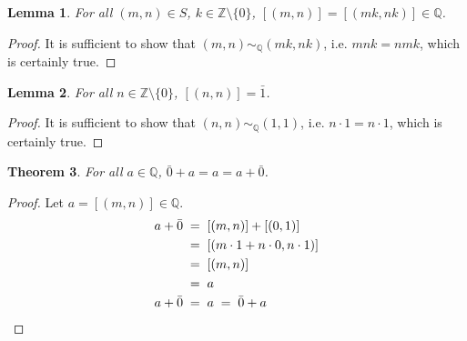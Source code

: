 \documentclass[10pt]{article}
\newtheorem{theorem}{Theorem}[section]
\newtheorem{lemma}[theorem]{Lemma}
\theoremstyle{definition}
\theoremstyle{remark}
\newcommand{\Z}{\mathbb{Z}}
\newcommand{\Q}{\mathbb{Q}}
\newcommand{\simQ}{\sim_{\Q}}
\begin{document}
        
        \begin{lemma}
                For all $(m, n) \in S$, $k \in \Z\setminus\{0\}$,
                $[(m, n)] = [(mk, nk)] \in \Q$.
        \end{lemma}
        \begin{proof}
                It is sufficient to show that $(m, n) \simQ (mk, nk)$, i.e.
                $mnk = nmk$, which is certainly true.
        \end{proof}
        \begin{lemma}
                For all $n \in \Z\setminus\{0\}$, $[(n, n)] = \bar{1}$.
        \end{lemma}
        \begin{proof}
                It is sufficient to show that $(n, n) \simQ (1, 1)$, i.e.
                $n\cdot 1 = n\cdot 1$, which is certainly true.
        \end{proof}

        \begin{theorem}
                For all $a \in \Q$, $\bar{0} + a = a = a + \bar{0}$.
        \end{theorem}
        \begin{proof}
                Let $a = [(m, n)] \in \Q$.
                \begin{align*}
                        a + \bar{0} \;&=\; [(m, n)] + [(0, 1)] \\
                                \;&=\; [(m \cdot 1 + n\cdot 0, n \cdot 1)] \\
                                \;&=\; [(m, n)] \\
                                \;&=\; a \\
                        a + \bar{0} \;&=\; a \;=\; \bar{0} + a \qedhere
                \end{align*}
        \end{proof}
        
\end{document}
